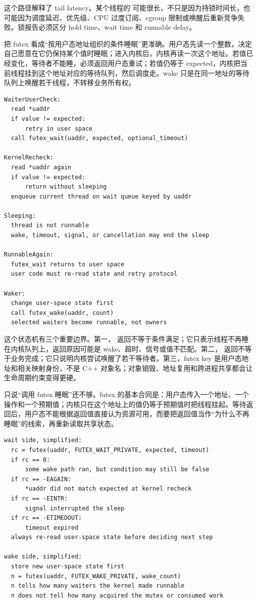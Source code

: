 这个路径解释了 tail latency。某个线程的  可能很长，不只是因为持锁时间长，也可能因为调度延迟、优先级、CPU 过度订阅、cgroup 限制或唤醒后重新竞争失败。锁报告必须区分 hold time、wait time 和 runnable delay。

把 futex 看成“按用户态地址组织的条件睡眠”更准确。用户态先读一个整数，决定自己愿意在它仍保持某个值时睡眠；进入内核后，内核再读一次这个地址。若值已经变化，等待者不能睡，必须返回用户态重试；若值仍等于 expected，内核把当前线程挂到这个地址对应的等待队列，然后调度走。wake 只是在同一地址的等待队列上唤醒若干线程，不转移业务所有权。

\begin{lstlisting}[numbers=none,caption={futex wait/wake 的状态机}]
WaiterUserCheck:
  read *uaddr
  if value != expected:
      retry in user space
  call futex_wait(uaddr, expected, optional_timeout)

KernelRecheck:
  read *uaddr again
  if value != expected:
      return without sleeping
  enqueue current thread on wait queue keyed by uaddr

Sleeping:
  thread is not runnable
  wake, timeout, signal, or cancellation may end the sleep

RunnableAgain:
  futex_wait returns to user space
  user code must re-read state and retry protocol

Waker:
  change user-space state first
  call futex_wake(uaddr, count)
  selected waiters become runnable, not owners
\end{lstlisting}

这个状态机有三个重要边界。第一， 返回不等于条件满足；它只表示线程不再睡在内核队列上，返回原因可能是 wake、超时、信号或值不匹配。第二， 返回不等于业务完成；它只说明内核尝试唤醒了若干等待者。第三，futex key 是用户态地址和相关映射身份，不是 C++ 对象名；对象销毁、地址复用和跨进程共享都会让生命周期约束变得更硬。

只说“调用 futex 睡眠”还不够。futex 的基本合同是：用户态传入一个地址、一个操作和一个预期值；内核只在这个地址上的值仍等于预期值时把线程挂起。等待返回后，用户态不能根据返回值直接认为资源可用，而要把返回值当作“为什么不再睡眠”的线索，再重新读取共享状态。

\begin{lstlisting}[numbers=none,caption={futex wait/wake 的系统调用层合同}]
wait side, simplified:
  rc = futex(uaddr, FUTEX_WAIT_PRIVATE, expected, timeout)
  if rc == 0:
      some wake path ran, but condition may still be false
  if rc == -EAGAIN:
      *uaddr did not match expected at kernel recheck
  if rc == -EINTR:
      signal interrupted the sleep
  if rc == -ETIMEDOUT:
      timeout expired
  always re-read user-space state before deciding next step

wake side, simplified:
  store new user-space state first
  n = futex(uaddr, FUTEX_WAKE_PRIVATE, wake_count)
  n tells how many waiters the kernel made runnable
  n does not tell how many acquired the mutex or consumed work
\end{lstlisting}

